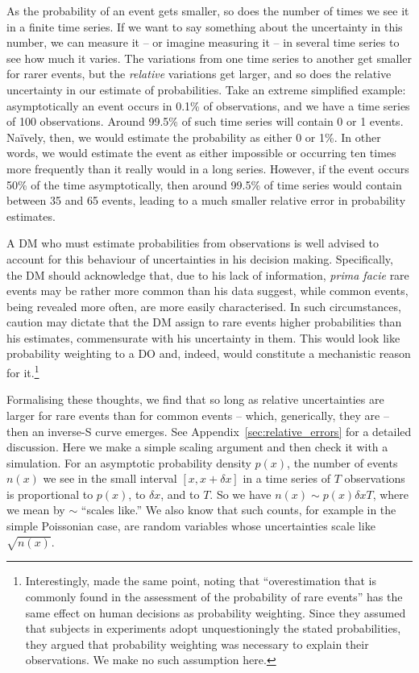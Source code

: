 \documentclass[a4paper, 12pt]{article}
\newcommand{\Appref}[1]{Appendix~\ref{sec:#1}}
\begin{document}
As the probability of an event gets smaller, so does the number of times we see it in a finite time series. If we want to say something about the uncertainty in this number, we can measure it -- or imagine measuring it -- in several time series to see how much it varies. The variations from one time series to another get smaller for rarer events, but the \textit{relative} variations get larger, and so does the relative uncertainty in our estimate of probabilities. Take an extreme simplified example: asymptotically an event occurs in 0.1\% of observations, and we have a time series of 100 observations.
Around 99.5\% of such time series will contain 0 or 1 events. Na\"{i}vely, then, we would estimate the probability as either 0 or 1\%. In other words, we would estimate the event as either impossible or occurring ten times more frequently than it really would in a long series. However, if the event occurs 50\% of the time asymptotically, then around 99.5\% of time series would contain between 35 and 65 events, leading to a much smaller relative error in probability estimates.

A DM who must estimate probabilities from observations is well advised to account for this behaviour of uncertainties in his decision making. Specifically, the DM should acknowledge that, due to his lack of information, \textit{prima facie} rare events may be rather more common than his data suggest, while common events, being revealed more often, are more easily characterised. In such circumstances, caution may dictate that the DM assign to rare events higher probabilities than his estimates, commensurate with his uncertainty in them. This would look like probability weighting to a DO and, indeed, would constitute a mechanistic reason for it.\footnote{Interestingly, \textcite[281]{KahnemanTversky1979} made the same point, noting that ``overestimation that is commonly found in the assessment of the probability of rare events'' has the same effect on human decisions as probability weighting. Since they assumed that subjects in experiments adopt unquestioningly the stated probabilities, they argued that probability weighting was necessary to explain their observations. We make no such assumption here.}

Formalising these thoughts, we find that so long as relative uncertainties are larger for rare events than for common events -- which, generically, they are -- then an inverse-S curve emerges. See \Appref{relative_errors} for a detailed discussion. Here we make a simple scaling argument and then check it with a simulation. For an asymptotic probability density $p(x)$, the number of events $n(x)$ we see in the small interval $[x, x+ \delta x]$ in a time series of $T$ observations is proportional to $p(x)$, to $\delta x$, and to $T$. So we have $n(x) \sim p(x) \delta x T$, where we mean by $\sim$ ``scales like.'' We also know that such counts, for example in the simple Poissonian case, are random variables whose uncertainties scale like $\sqrt{n(x)}$.
\end{document}
